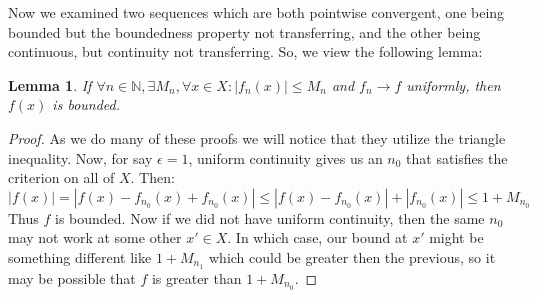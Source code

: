 \documentclass[10pt,letterpaper]{article} %
\newtheorem{lem}{Lemma}[section]
\begin{document}
Now we examined two sequences which are both pointwise convergent, one being bounded but the boundedness property not transferring, and the other being continuous, but continuity not transferring. So, we view the following lemma:
\begin{lem}
If $\forall n \in \mathbb{N}, \exists M_n, \forall x \in X: |f_n(x)| \leqslant M_n$ and $f_n \xrightarrow{} f$ uniformly, then $f(x)$ is bounded.
\end{lem}
\begin{proof}
As we do many of these proofs we will notice that they utilize the triangle inequality. Now, for say $\epsilon = 1$, uniform continuity gives us an $n_0$ that satisfies the criterion on all of $X$. Then:
\begin{equation*}
  |f(x)| = |f(x) - f_{n_0}(x) + f_{n_0}(x)| \leqslant |f(x) - f_{n_0}(x)| + |f_{n_0}(x)| \leqslant 1 + M_{n_0}
\end{equation*}
Thus $f$ is bounded. Now if we did not have uniform continuity, then the same $n_0$ may not work at some other $x' \in X$. In which case, our bound at $x'$ might be something different like $1 + M_{n_1}$ which could be greater then the previous, so it may be possible that $f$ is greater than $1 + M_{n_0}$.
\end{proof}
\end{document}
